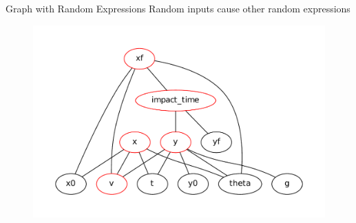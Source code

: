 \documentclass[compress, blue]{beamer}
\begin{document}
\begin{frame}{Graph with Random Expressions}
    Random inputs cause other random expressions
    \begin{figure}
        \includegraphics[width=\textwidth]{images/uncertain-dag.pdf}
    \end{figure}

\end{frame}
\end{document}

